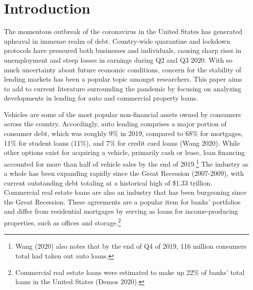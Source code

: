 \documentclass[10.5pt]{article}
\begin{document}
\section{Introduction}
The momentous outbreak of the coronavirus in the United States has generated upheaval in immense realm of debt. Country-wide quarantine and lockdown protocols have pressured both businesses and individuals, causing sharp rises in unemployment and steep losses in earnings during Q2 and Q3 2020. With so much uncertainty about future economic conditions, concern for the stability of lending markets has been a popular topic amongst researchers. This paper aims to add to current literature surrounding the pandemic by focusing on analyzing developments in lending for auto and commercial property loans.

Vehicles are some of the most popular non-financial assets owned by consumers across the country. Accordingly, auto lending comprises a major portion of consumer debt, which was roughly 9\% in 2019, compared to 68\% for mortgages, 11\% for student loans (11\%), and 7\% for credit card loans (Wang 2020). While other options exist for acquiring a vehicle, primarily cash or lease, loan financing accounted for more than half of vehicle sales by the end of 2019.\footnote{Wang (2020) also notes that by the end of Q4 of 2019, 116 million consumers total had taken out auto loans.}  The industry as a whole has been expanding rapidly since the Great Recession (2007-2009), with current outstanding debt totaling at a historical high of \$1.33 trillion.
Commercial real estate loans are also an industry that has been burgeoning since the Great Recession. These agreements are a popular item for banks' portfolios and differ from residential mortgages by serving as loans for income-producing properties, such as offices and storage.\footnote{Commercial real estate loans were estimated to make up 22\% of banks' total loans in the United States (Demos 2020).}
\end{document}
